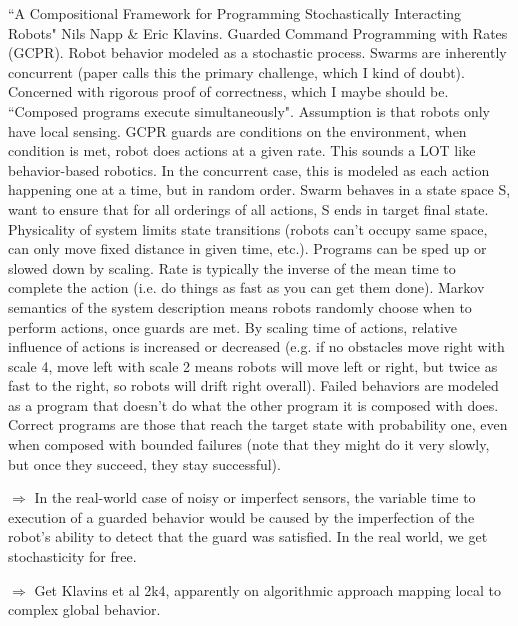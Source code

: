\documentclass[]{article}
\begin{document}
``A Compositional Framework for Programming Stochastically Interacting Robots" \cite{napp2011compositional} Nils Napp \& Eric Klavins. Guarded Command Programming with Rates (GCPR). Robot behavior modeled as a stochastic process. Swarms are inherently concurrent (paper calls this the primary challenge, which I kind of doubt). Concerned with rigorous proof of correctness, which I maybe should be. ``Composed programs execute simultaneously". Assumption is that robots only have local sensing. GCPR guards are conditions on the environment, when condition is met, robot does actions at a given rate. This sounds a LOT like behavior-based robotics. In the concurrent case, this is modeled as each action happening one at a time, but in random order. Swarm behaves in a state space S, want to ensure that for all orderings of all actions, S ends in target final state. Physicality of system limits state transitions (robots can't occupy same space, can only move fixed distance in given time, etc.). Programs can be sped up or slowed down by scaling. Rate is typically the inverse of the mean time to complete the action (i.e. do things as fast as you can get them done). Markov semantics of the system description means robots randomly choose when to perform actions, once guards are met. By scaling time of actions, relative influence of actions is increased or decreased (e.g. if no obstacles move right with scale 4, move left with scale 2 means robots will move left or right, but twice as fast to the right, so robots will drift right overall). Failed behaviors are modeled as a program that doesn't do what the other program it is composed with does. Correct programs are those that reach the target state with probability one, even when composed with bounded failures (note that they might do it very slowly, but once they succeed, they stay successful).

$\Rightarrow$ In the real-world case of noisy or imperfect sensors, the variable time to execution of a guarded behavior would be caused by the imperfection of the robot's ability to detect that the guard was satisfied. In the real world, we get stochasticity for free. 

$\Rightarrow$ Get Klavins et al 2k4, apparently on algorithmic approach mapping local to complex global behavior.  
\end{document}
